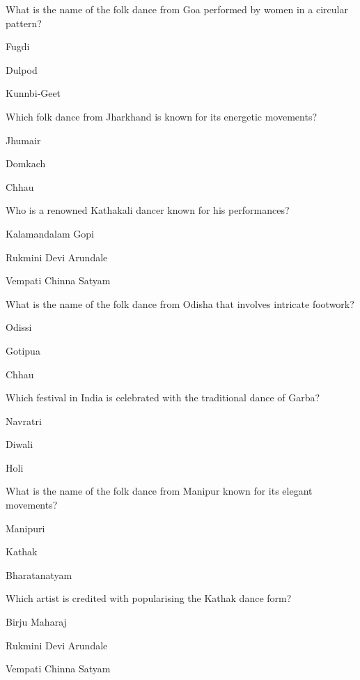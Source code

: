 \begin{enhancedmcq}{What is the name of the folk dance from Goa performed by women in a circular pattern?}
\item Fugdi
\item Dulpod
\item Kunnbi‑Geet

\end{enhancedmcq}
\begin{enhancedmcq}{Which folk dance from Jharkhand is known for its energetic movements?}
\item Jhumair
\item Domkach
\item Chhau

\end{enhancedmcq}
\begin{enhancedmcq}{Who is a renowned Kathakali dancer known for his performances?}
\item Kalamandalam Gopi
\item Rukmini Devi Arundale
\item Vempati Chinna Satyam

\end{enhancedmcq}
\begin{enhancedmcq}{What is the name of the folk dance from Odisha that involves intricate footwork?}
\item Odissi
\item Gotipua
\item Chhau

\end{enhancedmcq}
\begin{enhancedmcq}{Which festival in India is celebrated with the traditional dance of Garba?}
\item Navratri
\item Diwali
\item Holi

\end{enhancedmcq}
\begin{enhancedmcq}{What is the name of the folk dance from Manipur known for its elegant movements?}
\item Manipuri
\item Kathak
\item Bharatanatyam

\end{enhancedmcq}
\begin{enhancedmcq}{Which artist is credited with popularising the Kathak dance form?}
\item Birju Maharaj
\item Rukmini Devi Arundale
\item Vempati Chinna Satyam

\end{enhancedmcq}
